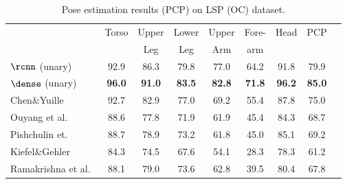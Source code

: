 \tabcolsep 1.5pt
\begin{table}[tbp]
 \scriptsize
  \centering
  \begin{tabular}{@{} l cc ccc ccc@{}}
    \toprule
    &Torso & Upper & Lower & Upper & Fore- & Head  & PCP \\
    &   & Leg   & Leg& Arm   & arm   &       &       \\
    \midrule
    $\rcnn$ (unary) & 92.9  & 86.3  & 79.8  & 77.0  & 64.2  & 91.8 & 79.9 \\   
    \midrule
    $\dense$ (unary)          & \textbf{96.0}  & \textbf{91.0}  & \textbf{83.5}  & \textbf{82.8}  & \textbf{71.8}  & \textbf{96.2} & \textbf{85.0} \\
    \midrule
    Chen\&Yuille~\cite{chen14nips}& 92.7  & 82.9  & 77.0  & 69.2  & 55.4  & 87.8 & 75.0 \\
    Ouyang et al.~\cite{ouyang14cvpr}& 88.6  & 77.8  & 71.9  & 61.9  & 45.4  & 84.3 & 68.7 \\
    Pishchulin et.~\cite{pishchulin13iccv}& 88.7  & 78.9  & 73.2  & 61.8  & 45.0  & 85.1 & 69.2 \\
    Kiefel\&Gehler~\cite{kiefel14eccv}& 84.3  & 74.5  & 67.6  & 54.1  & 28.3  & 78.3 & 61.2 \\
    Ramakrishna et al.~\cite{ramakrishna14eccv}& 88.1  & 79.0  & 73.6  & 62.8  & 39.5  & 80.4 & 67.8 \\
    \bottomrule
  \end{tabular}
  \caption[]{Pose estimation results (PCP) on LSP (OC) dataset.}
    \vspace{-1.5em}
  \label{tab:multicut:lsp-oc-pcp}
\end{table}
